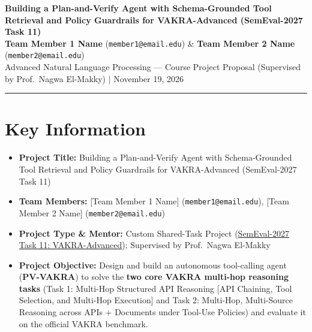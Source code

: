 \documentclass[10pt]{article}
\begin{document}
\begin{center}
    {\Large \textbf{Building a Plan-and-Verify Agent with Schema-Grounded Tool Retrieval and Policy Guardrails for VAKRA-Advanced (SemEval-2027 Task 11)}}\\[0.35em]
    {\normalsize \textbf{Team Member 1 Name} (\texttt{member1@email.edu}) \quad \& \quad \textbf{Team Member 2 Name} (\texttt{member2@email.edu})}\\
    {\small Advanced Natural Language Processing --- Course Project Proposal (Supervised by Prof.\ Nagwa El-Makky) \quad $|$ \quad November 19, 2026}
\end{center}
\vspace{-0.35cm}
\hrule
\vspace{0.15cm}

\section{Key Information}
\begin{itemize}
    \item \textbf{Project Title:} Building a Plan-and-Verify Agent with Schema-Grounded Tool Retrieval and Policy Guardrails for VAKRA-Advanced (SemEval-2027 Task 11)
    \item \textbf{Team Members:} [Team Member 1 Name] (\texttt{member1@email.edu}), [Team Member 2 Name] (\texttt{member2@email.edu})
    \item \textbf{Project Type \& Mentor:} Custom Shared-Task Project (\href{https://sites.google.com/view/vakrasemeval2027}{SemEval-2027 Task 11: VAKRA-Advanced}); Supervised by Prof.\ Nagwa El-Makky
    \item \textbf{Project Objective:} Design and build an autonomous tool-calling agent (\textbf{PV-VAKRA}) to solve the \textbf{two core VAKRA multi-hop reasoning tasks} (Task 1: Multi-Hop Structured API Reasoning [API Chaining, Tool Selection, and Multi-Hop Execution] and Task 2: Multi-Hop, Multi-Source Reasoning across APIs + Documents under Tool-Use Policies) and evaluate it on the official VAKRA benchmark.
\end{itemize}

\end{document}
